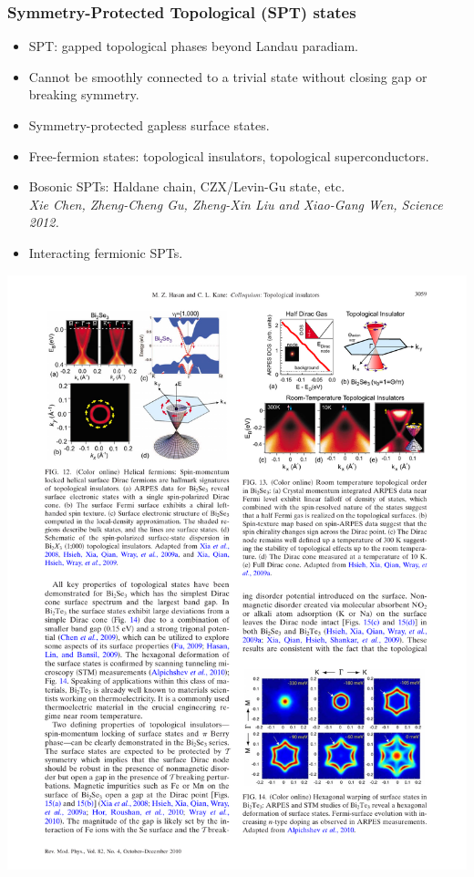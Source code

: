 \documentclass[xcolor=table, aspectratio=169]{beamer}
\begin{document}
\begin{frame}
  \frametitle{Symmetry-Protected Topological (SPT) states}
\begin{itemize}
\item SPT: gapped topological phases beyond Landau paradiam.
\item Cannot be smoothly connected to a trivial state without closing gap or breaking symmetry.
\item Symmetry-protected gapless surface states.
\item Free-fermion states: topological insulators, topological superconductors.
\item Bosonic SPTs: Haldane chain, CZX/Levin-Gu state, etc.\\
\emph{Xie Chen, Zheng-Cheng Gu, Zheng-Xin Liu and Xiao-Gang Wen, Science 2012.}
\item Interacting fermionic SPTs.
\end{itemize}
\begin{center}
	\includegraphics{../spspt/ti_surface}
\end{center}
\end{frame}
\end{document}
